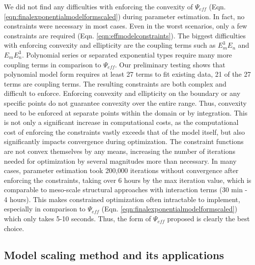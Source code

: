     We did not find any difficulties with enforcing the convexity of $\Psi_{eff}$ (Eqn. \ref{eqn:finalexponentialmodelformscaled}) during parameter estimation. In fact, no constraints were necessary in most cases. Even in the worst scenarios, only a few constraints are required (Eqn. \ref{eqn:effmodelconstraints}). The biggest difficulties with enforcing convexity and ellipticity are the coupling terms such as $E_m^3E_n$ and $E_mE_n^3$. Polynomial series or separated exponential types require many more coupling terms in comparison to $\Psi_{eff}$. Our preliminary testing shows that polynomial model form requires at least 27 terms to fit existing data, 21 of the 27 terms are coupling terms. The resulting constraints are both complex and difficult to enforce. Enforcing convexity and ellipticity on the boundary or any specific points do not guarantee convexity over the entire range. Thus, convexity need to be enforced at separate points within the domain or by integration. This is not only a significant increase in computational costs, as the computational cost of enforcing the constraints vastly exceeds that of the model itself, but also significantly impacts convergence during optimization. The constraint functions are not convex themselves by any means, increasing the number of iterations needed for optimization by several magnitudes more than necessary. In many cases, parameter estimation took 200,000 iterations without convergence after enforcing the constraints, taking over 6 hours by the max iteration value, which is comparable to meso-scale structural approaches with interaction terms \cite{zhang_modeling_2017}(30 min - 4 hours). This makes constrained optimization often intractable to implement, especially in comparison to $\Psi_{eff}$ (Eqn. \ref{eqn:finalexponentialmodelformscaled}) which only takes 5-10 seconds. Thus, the form of $\Psi_{eff}$ proposed is clearly the best choice. 
    

\subsection{Model scaling method and its applications}
    
